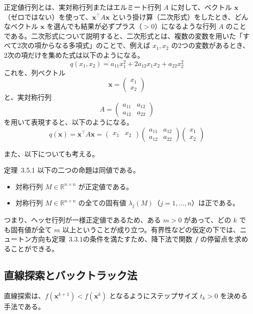 \documentclass[a4j]{jarticle}
\begin{document}
正定値行列とは、実対称行列またはエルミート行列 $A$ に対して、ベクトル $\bm{x}$（ゼロではない）を使って、$\bm{x}^\top A\bm{x}$ という掛け算（二次形式）をしたとき、どんなベクトル $\bm{x}$ を選んでも結果が必ずプラス（$>0$）になるような行列 $A$ のことである。二次形式について説明すると、二次形式とは、複数の変数を用いた「すべて2次の項からなる多項式」のことで、例えば $x_1,x_2$ の2つの変数があるとき、2次の項だけを集めた式は以下のようになる。
\[
  q(x_1,x_2)=a_{11}x_1^2+2a_{12}x_1x_2+a_{22}x_2^2
\]
これを、列ベクトル
\[
  \bm{x}=\begin{pmatrix}x_1\\x_2\end{pmatrix}
\]
と、実対称行列
\[
  A=\begin{pmatrix}a_{11}&a_{12}\\a_{12}&a_{22}\end{pmatrix}
\]
を用いて表現すると、以下のようになる。
\[
  q(\bm{x})=\bm{x}^\top A\bm{x}
  =\begin{pmatrix}x_1&x_2\end{pmatrix}
  \begin{pmatrix}a_{11}&a_{12}\\a_{12}&a_{22}\end{pmatrix}
  \begin{pmatrix}x_1\\x_2\end{pmatrix}
\]

また、以下についても考える。
\begin{itembox}[l]{定理~3.5.1}
  以下の二つの命題は同値である。
  \begin{itemize}
    \item 対称行列 $M\in\mathbb{R}^{n\times n}$ が正定値である。
    \item 対称行列 $M\in\mathbb{R}^{n\times n}$ の全ての固有値 $\lambda_j(M)$（$j=1,\ldots,n$）は正である。
  \end{itemize}
\end{itembox}

つまり、ヘッセ行列が一様正定値であるため、ある $m>0$ があって、どの $k$ でも固有値が全て $m$ 以上ということが成り立つ。有界性などの仮定の下では、ニュートン方向も定理~3.3.1の条件を満たすため、降下法で関数 $f$ の停留点を求めることができる。

\subsection{直線探索とバックトラック法}
\label{sec:line-search}
直線探索は、$f(\bm{x}^{k+1})<f(\bm{x}^k)$ となるようにステップサイズ $t_k>0$ を決める手法である。
\end{document}
